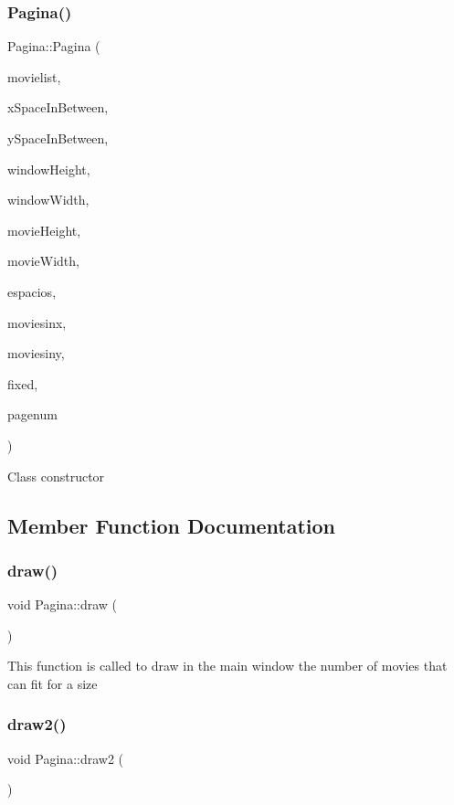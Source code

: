 \subsubsection{\texorpdfstring{Pagina()}{Pagina()}}
{\footnotesize\ttfamily Pagina\+::\+Pagina (\begin{DoxyParamCaption}\item[{\hyperlink{classLinkedlist}{Linkedlist} $\ast$}]{movielist,  }\item[{int}]{x\+Space\+In\+Between,  }\item[{int}]{y\+Space\+In\+Between,  }\item[{int}]{window\+Height,  }\item[{int}]{window\+Width,  }\item[{int}]{movie\+Height,  }\item[{int}]{movie\+Width,  }\item[{int}]{espacios,  }\item[{int}]{moviesinx,  }\item[{int}]{moviesiny,  }\item[{Gtk\+Widget $\ast$}]{fixed,  }\item[{int}]{pagenum }\end{DoxyParamCaption})}

Class constructor 

\subsection{Member Function Documentation}
\mbox{\label{classPagina_a3443b322fb5eb076528970457daa5b34}} 
\subsubsection{\texorpdfstring{draw()}{draw()}}
{\footnotesize\ttfamily void Pagina\+::draw (\begin{DoxyParamCaption}{ }\end{DoxyParamCaption})}

This function is called to draw in the main window the number of movies that can fit for a size \mbox{\label{classPagina_a7c5939c4dcd981100471e89fdd5466f3}} 
\subsubsection{\texorpdfstring{draw2()}{draw2()}}
{\footnotesize\ttfamily void Pagina\+::draw2 (\begin{DoxyParamCaption}{ }\end{DoxyParamCaption})}

